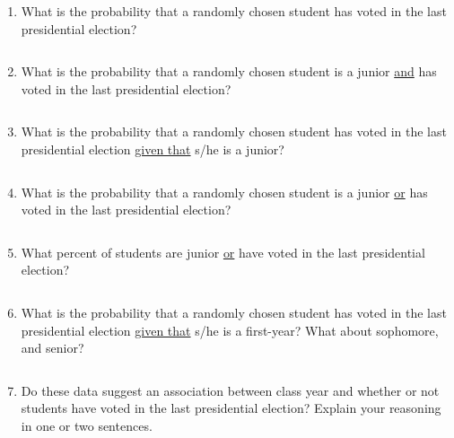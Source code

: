 \documentclass[11pt]{article}
\newcommand{\soln}[2]{$\:$\\ \vspace{#1}}{}
\begin{document}
\begin{enumerate}

\item  What is the probability that a randomly chosen student has voted in the last 
presidential election?

\soln{2cm}{P(voted) = 67 / 176 = 0.38}

\item What is the probability that a randomly chosen student is a junior \underline{and} 
has voted in the last presidential election?

\soln{2cm}{P(junior and voted) = 41 / 176 = 0.23}

\item What is the probability that a randomly chosen student  has voted in the last presidential 
election \underline{given that} s/he is a junior?

\soln{2cm}{P(voted~$|$~junior) = 41 / 54 = 0.76}

%

\item What is the probability that a randomly chosen student is a junior \underline{or} 
has voted in the last presidential election?

\soln{2cm}{P(junior or voted) = (67 + 54 - 41) / 176 =  0.45}

\item What percent of students are junior \underline{or} have voted in the last 
presidential election?

\soln{1cm}{Same as above, 45\%.}

\item What is the probability that a randomly chosen student has voted in the last presidential 
election \underline{given that} s/he is a first-year? What about sophomore, and senior?

\soln{2cm}{P(voted~$|$~first-year) = 3 / 44 = 0.07 \\
P(voted~$|$~sophomore) = 14 / 64 = 0.22 \\
P(voted~$|$~senior) = 9 / 14 = 0.64}

\item Do these data suggest an association between class year and whether or not 
students have voted in the last presidential election? Explain your reasoning in one or 
two sentences.

\soln{2cm}{Yes, it does. Likelihood of voting varies by class year.}

\end{enumerate}
\end{document}
